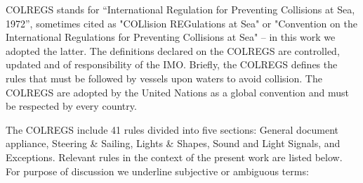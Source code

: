     \ac{COLREGS}\cite{COLREGS} stands for “International Regulation for Preventing Collisions at Sea, 1972”, sometimes cited as "COLlision REGulations at Sea" or "Convention on the International Regulations for Preventing Collisions at Sea" -- in this work we adopted the latter. The definitions declared on the \ac{COLREGS} are controlled, updated and of responsibility of the \ac{IMO}. Briefly, the \ac{COLREGS} defines the rules that must be followed by vessels upon waters to avoid collision. 
    The \ac{COLREGS} are adopted by the United Nations as a global convention and must be respected by every country.
    
    The \ac{COLREGS} include 41 rules divided into five sections: General document appliance, Steering \& Sailing, Lights \& Shapes, Sound and Light Signals, and Exceptions. Relevant rules in the context of the present work are listed below. For purpose of discussion we underline subjective or ambiguous terms:
    
